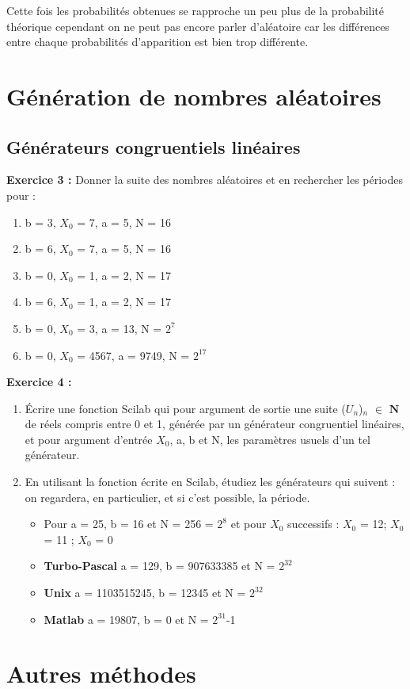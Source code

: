 \documentclass[oneside]{book}
\begin{document}
Cette fois les probabilités obtenues se rapproche un peu plus de la probabilité théorique cependant on ne peut pas encore parler d'aléatoire car les différences entre chaque probabilités d'apparition est bien trop différente.
\section{Génération de nombres aléatoires}
\subsection{Générateurs congruentiels linéaires}
\textbf{Exercice 3 :}
Donner la suite des nombres aléatoires et en rechercher les périodes pour : 
\begin{enumerate}
	\item b = 3, $X_0$ = 7, a = 5, N = 16 
	\item b = 6, $X_0$ = 7, a = 5, N = 16 
	\item b = 0, $X_0$ = 1, a = 2, N = 17 
	\item b = 6, $X_0$ = 1, a = 2, N = 17 
	\item b = 0, $X_0$ = 3, a = 13, N = $2^7$ 
	\item b = 0, $X_0$ = 4567, a = 9749, N = $2^{17}$ 
\end{enumerate}
\textbf{Exercice 4 :}
\begin{enumerate}
	\item Écrire une fonction Scilab qui pour argument de sortie une suite ($U_{n}$)$_{n}$ $\in$ $\mathbf{N}$ de réels compris entre 0 et 1, générée par un générateur congruentiel linéaires, et pour argument d'entrée $X_0$, a, b et N, les paramètres usuels d'un tel générateur.
	\item En utilisant la fonction écrite en Scilab, étudiez les générateurs qui suivent : on regardera, en particulier, et si c'est possible, la période.
	\begin{itemize}
		\item Pour a = 25, b = 16 et N = 256 = $2^8$ et pour $X_0$ successifs : $X_0$ = 12; $X_0$ = 11 ; $X_0$ = 0
		\item \textbf{Turbo-Pascal} a = 129, b = 907633385 et N = $2^{32}$
		\item \textbf{Unix} a = 1103515245, b = 12345 et N = $2^{32}$
		\item \textbf{Matlab} a = 19807, b = 0 et N = $2^{31}$-1
	\end{itemize}
\end{enumerate}
\section{Autres méthodes}
\end{document}
